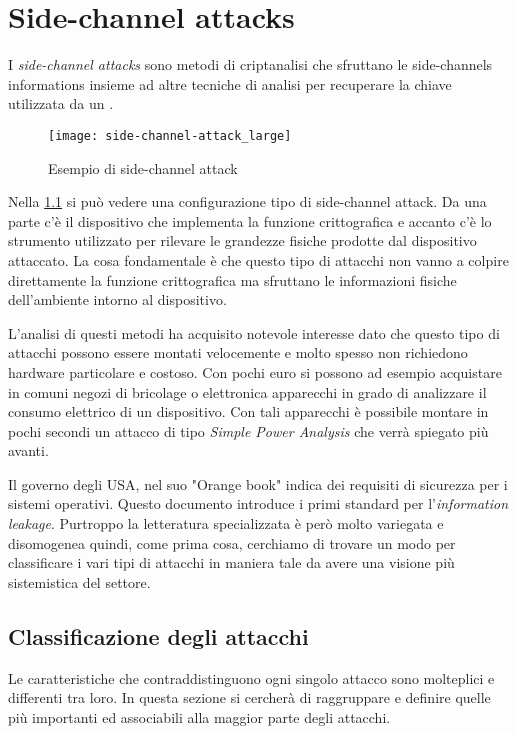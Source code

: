 \chapter{Side-channel attacks}
	I \emph{side-channel attacks} sono metodi di criptanalisi che sfruttano le side-channels informations insieme ad altre tecniche di analisi per recuperare la chiave utilizzata da un \disps\cite{standaert2010introduction}.
	
	\begin{figure}
		\begin{center}
			\texttt{[image: side-channel-attack\_large]}
			\caption{Esempio di side-channel attack}
			\label{fig:attack}
		\end{center}
	\end{figure}
	
	Nella \cref{fig:attack} si può vedere una configurazione tipo di side-channel attack. Da una parte c'è il dispositivo che implementa la funzione crittografica e accanto c'è lo strumento utilizzato per rilevare le grandezze fisiche prodotte dal dispositivo attaccato. La cosa fondamentale è che questo tipo di attacchi non vanno a colpire direttamente la funzione crittografica ma sfruttano le informazioni fisiche dell'ambiente intorno al dispositivo.
	
	L'analisi di questi metodi ha acquisito notevole interesse dato che questo tipo di attacchi possono essere montati velocemente e molto spesso non richiedono hardware particolare e costoso. Con pochi euro si possono ad esempio acquistare in comuni negozi di bricolage o elettronica apparecchi in grado di analizzare il consumo elettrico di un dispositivo. Con tali apparecchi è possibile montare in pochi secondi un attacco di tipo \emph{Simple Power Analysis}\cite{mangard2002simple} che verrà spiegato più avanti. 
	
	Il governo degli USA, nel suo "Orange book"\cite{latham1986department} indica dei requisiti di sicurezza per i sistemi operativi. Questo documento introduce i primi standard per l'\emph{information leakage}. Purtroppo la letteratura specializzata è però molto variegata e disomogenea quindi, come prima cosa, cerchiamo di trovare un modo per classificare i vari tipi di attacchi in maniera tale da avere una visione più sistemistica del settore.
	
	\section{Classificazione degli attacchi}	
		Le caratteristiche che contraddistinguono ogni singolo attacco sono molteplici e differenti tra loro. In questa sezione si cercherà di raggruppare e definire quelle più importanti ed associabili alla maggior parte degli attacchi.
	
